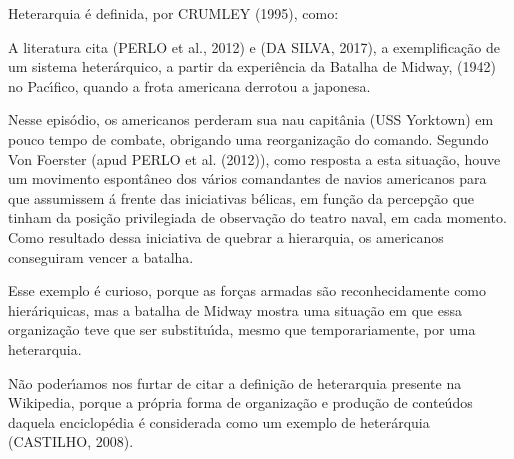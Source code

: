 \documentclass[
12pt,		%
openright,	%
twoside,  %
a4paper,			%
chapter=TITLE,		%
english,			%
french,				%
spanish,			%
brazil				%
]{USPSC-classe/USPSC}
\begin{document}
Heterarquia \'e definida, por  CRUMLEY (1995), como:









\noindent\begin{center}\mbox{\centering{}}\end{center}


A literatura cita (PERLO et al., 2012) e (DA SILVA, 2017), a exemplifica\c{c}\~ao de um sistema heter\'arquico, a partir da experi\^encia da Batalha de Midway, (1942) no Pac\'{\i}fico, quando a frota americana derrotou a japonesa.








Nesse epis\'odio, os americanos perderam sua nau capit\^ania (USS Yorktown) em pouco tempo de combate, obrigando uma reorganiza\c{c}\~ao do comando. Segundo Von Foerster (apud  PERLO et al. (2012)), como resposta a esta situa\c{c}\~ao, houve um movimento espont\^aneo dos v\'arios comandantes de navios americanos para que assumissem \'a frente das iniciativas b\'elicas, em fun\c{c}\~ao da percep\c{c}\~ao que tinham da posi\c{c}\~ao privilegiada de observa\c{c}\~ao do teatro naval, em cada momento. Como resultado dessa iniciativa de \textquotedbl quebrar a hierarquia\textquotedbl , os americanos conseguiram vencer a batalha.








Esse exemplo \'e curioso, porque as for\c{c}as armadas s\~ao reconhecidamente como hier\'ariquicas, mas a batalha de Midway mostra uma situa\c{c}\~ao em que essa organiza\c{c}\~ao teve que ser substitu\'{\i}da, mesmo que temporariamente, por uma heterarquia.








N\~ao poder\'{\i}amos nos furtar de citar a defini\c{c}\~ao de heterarquia presente na Wikipedia, porque a pr\'opria forma de organiza\c{c}\~ao e produ\c{c}\~ao de conte\'udos daquela enciclop\'edia \'e considerada como um exemplo de heter\'arquia  (CASTILHO, 2008).
\end{document}
